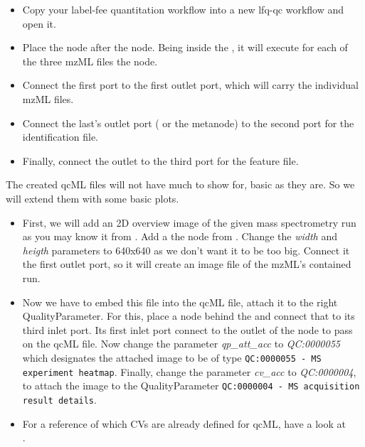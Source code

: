 \begin{itemize} 
\item Copy your label-fee quantitation workflow into a new lfq-qc workflow and open it.
\item Place the  node after the  node. Being inside the , it will execute for each of the three mzML files the  node.
\item Connect the first  port to the first  outlet port, which will carry the individual mzML files.
\item Connect the last's  outlet port ( or the  metanode) to the second  port for the identification file.
\item Finally, connect the  outlet to the third  port for the feature file.
\end{itemize}

The created qcML files will not have much to show for, basic as they are. So we will extend them with some basic plots.
\begin{itemize}
\item First, we will add an 2D overview image of the given mass spectrometry run as you may know it from . Add a the  node from . Change the \textit{width} and \textit{heigth} parameters to 640x640 as we don't want it to be too big. Connect it the first  outlet port, so it will create an image file of the mzML's contained run.
\item Now we have to embed this file into the qcML file, attach it to the right QualityParameter. For this, place a  node behind the  and connect that to its third inlet port. Its first inlet port connect to the outlet of the  node to pass on the qcML file. Now change the parameter \textit{qp\_att\_acc} to \textit{QC:0000055} which designates the attached image to be of type  \texttt{QC:0000055 - MS experiment heatmap}.
Finally, change the parameter \textit{cv\_acc} to \textit{QC:0000004}, to attach the image to the QualityParameter \texttt{QC:0000004 - MS acquisition result details}.
\item For a reference of which CVs are already defined for qcML, have a look at \\ .
\end{itemize}

